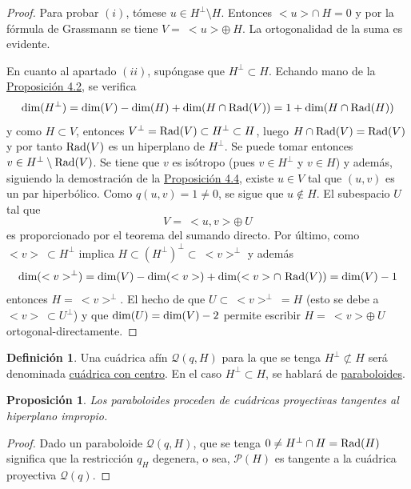 \documentclass[12pt]{report}
\newtheorem{proposition}{Proposición}[chapter]
\theoremstyle{definition}
\newtheorem{definition}{Definición}[chapter]
\theoremstyle{definition}
\theoremstyle{remark}
\begin{document}
\begin{proof}
Para probar $(i)$, tómese $u \in H^\perp \setminus H$. Entonces $<u> \cap \ H = 0$ y por la fórmula de Grassmann se tiene $V = \ <u> \oplus \ H$. La ortogonalidad de la suma es evidente.

\vspace{2mm}
En cuanto al apartado $(ii)$, supóngase que $H^\perp \subset H$. Echando mano de la \hyperref[prop4.1.]{\color{blue}Proposición 4.2}, se verifica
\[\textup{dim}(H^\perp) = \textup{dim}(V) - \textup{dim}(H) + \textup{dim}(H \cap \textup{Rad}(V)) = 1 + \textup{dim}(H \cap \textup{Rad}(H))\]
y como $H \subset V$, entonces $V^\perp = \textup{Rad}(V) \subset H^\perp \subset H$, luego $H \cap \textup{Rad}(V) = \textup{Rad}(V)$ y por tanto $\textup{Rad}(V)$ es un hiperplano de $H^\perp$. Se puede tomar entonces $v \in H^\perp \setminus \textup{Rad}(V)$. Se tiene que $v$ es isótropo (pues $v \in H^\perp$ y $v \in H$) y además, siguiendo la demostración de la \hyperref[prop4.4.]{\color{blue}Proposición 4.4}, existe $u \in V$ tal que $(u,v)$ es un par hiperbólico. Como $q(u,v) = 1 \neq 0$, se sigue que $u \notin H$. El subespacio $U$ tal que
\[V = \ <u,v> \oplus \ U\]
es proporcionado por el teorema del sumando directo. Por último, como $<v> \ \subset H^\perp$ implica $H \subset (H^\perp)^\perp \subset \ <v>^\perp$ y además
\[\textup{dim}(<v>^\perp) = \textup{dim}(V) - \textup{dim}(<v>) + \textup{dim}(<v> \cap \ \textup{Rad}(V)) = \textup{dim}(V) -1\]
entonces $H = \ <v>^\perp$. El hecho de que $U \subset \ <v>^\perp \ = H$ (esto se debe a $<v> \ \subset U^\perp$) y que $\textup{dim}(U) = \textup{dim}(V) - 2$ permite escribir $H = \ <v> \oplus \ U$ ortogonal-directamente.
\end{proof}

\begin{definition}
Una cuádrica afín $\mathcal{Q}(q,H)$ para la que se tenga $H^\perp \not\subset H$ será denominada \ul{cuádrica con centro}. En el caso $H^\perp \subset H$, se hablará de \ul{paraboloides}.
\end{definition}

\begin{proposition}
\label{prop6.3.}
    Los paraboloides proceden de cuádricas proyectivas tangentes al hiperplano impropio.
\end{proposition}

\begin{proof}
Dado un paraboloide $\mathcal{Q}(q,H)$, que se tenga $0 \neq H^\perp \cap H = \textup{Rad}(H)$ significa que la restricción $q_H$ degenera, o sea, $\mathcal{P}(H)$ es tangente a la cuádrica proyectiva $\mathcal{Q}(q)$.
\end{proof}
\end{document}
